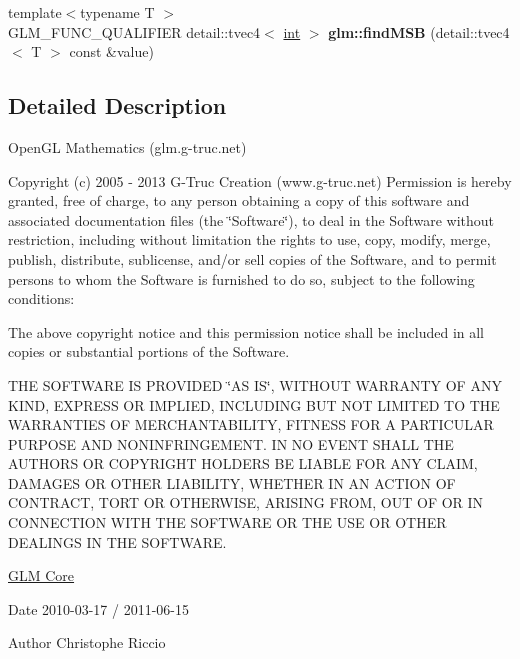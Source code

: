 \begin{DoxyCompactItemize}
\item 
\hypertarget{namespaceglm_aa14dd21dcab7f0510096f33e71a6bad6}{}{\footnotesize template$<$typename T $>$ }\\G\+L\+M\+\_\+\+F\+U\+N\+C\+\_\+\+Q\+U\+A\+L\+I\+F\+I\+E\+R detail\+::tvec4$<$ \hyperlink{_s_d_l__thread_8h_a6a64f9be4433e4de6e2f2f548cf3c08e}{int} $>$ {\bfseries glm\+::find\+M\+S\+B} (detail\+::tvec4$<$ T $>$ const \&value)\label{namespaceglm_aa14dd21dcab7f0510096f33e71a6bad6}

\end{DoxyCompactItemize}


\subsection{Detailed Description}
Open\+G\+L Mathematics (glm.\+g-\/truc.\+net)

Copyright (c) 2005 -\/ 2013 G-\/\+Truc Creation (www.\+g-\/truc.\+net) Permission is hereby granted, free of charge, to any person obtaining a copy of this software and associated documentation files (the \char`\"{}\+Software\char`\"{}), to deal in the Software without restriction, including without limitation the rights to use, copy, modify, merge, publish, distribute, sublicense, and/or sell copies of the Software, and to permit persons to whom the Software is furnished to do so, subject to the following conditions\+:

The above copyright notice and this permission notice shall be included in all copies or substantial portions of the Software.

T\+H\+E S\+O\+F\+T\+W\+A\+R\+E I\+S P\+R\+O\+V\+I\+D\+E\+D \char`\"{}\+A\+S I\+S\char`\"{}, W\+I\+T\+H\+O\+U\+T W\+A\+R\+R\+A\+N\+T\+Y O\+F A\+N\+Y K\+I\+N\+D, E\+X\+P\+R\+E\+S\+S O\+R I\+M\+P\+L\+I\+E\+D, I\+N\+C\+L\+U\+D\+I\+N\+G B\+U\+T N\+O\+T L\+I\+M\+I\+T\+E\+D T\+O T\+H\+E W\+A\+R\+R\+A\+N\+T\+I\+E\+S O\+F M\+E\+R\+C\+H\+A\+N\+T\+A\+B\+I\+L\+I\+T\+Y, F\+I\+T\+N\+E\+S\+S F\+O\+R A P\+A\+R\+T\+I\+C\+U\+L\+A\+R P\+U\+R\+P\+O\+S\+E A\+N\+D N\+O\+N\+I\+N\+F\+R\+I\+N\+G\+E\+M\+E\+N\+T. I\+N N\+O E\+V\+E\+N\+T S\+H\+A\+L\+L T\+H\+E A\+U\+T\+H\+O\+R\+S O\+R C\+O\+P\+Y\+R\+I\+G\+H\+T H\+O\+L\+D\+E\+R\+S B\+E L\+I\+A\+B\+L\+E F\+O\+R A\+N\+Y C\+L\+A\+I\+M, D\+A\+M\+A\+G\+E\+S O\+R O\+T\+H\+E\+R L\+I\+A\+B\+I\+L\+I\+T\+Y, W\+H\+E\+T\+H\+E\+R I\+N A\+N A\+C\+T\+I\+O\+N O\+F C\+O\+N\+T\+R\+A\+C\+T, T\+O\+R\+T O\+R O\+T\+H\+E\+R\+W\+I\+S\+E, A\+R\+I\+S\+I\+N\+G F\+R\+O\+M, O\+U\+T O\+F O\+R I\+N C\+O\+N\+N\+E\+C\+T\+I\+O\+N W\+I\+T\+H T\+H\+E S\+O\+F\+T\+W\+A\+R\+E O\+R T\+H\+E U\+S\+E O\+R O\+T\+H\+E\+R D\+E\+A\+L\+I\+N\+G\+S I\+N T\+H\+E S\+O\+F\+T\+W\+A\+R\+E.

\hyperlink{group__core}{G\+L\+M Core}

\begin{DoxyDate}{Date}
2010-\/03-\/17 / 2011-\/06-\/15 
\end{DoxyDate}
\begin{DoxyAuthor}{Author}
Christophe Riccio 
\end{DoxyAuthor}
